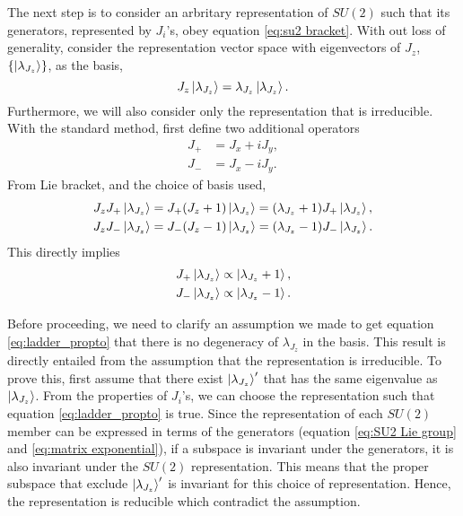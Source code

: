 \documentclass[preprint, 12pt]{revtex4-2}
\numberwithin{equation}{section}
\begin{document}
The next step is to consider an arbritary representation of $SU(2)$ such that its generators, represented by $J_i$'s, obey equation \ref{eq:su2 bracket}. With out loss of generality, consider the representation vector space with eigenvectors of $J_z$, $\{\ket{\lambda_{J_z}}\}$, as the basis,
\begin{equation}\label{eq:Jz eigenvalue equation}
    J_z\ket{\lambda_{J_z}}=\lambda_{J_z}\ket{\lambda_{J_z}}.
\end{equation}
Furthermore, we will also consider only the representation that is irreducible. With the standard method, first define two additional operators
\begin{equation}\label{eq:ladder operators}
    \begin{aligned}
        J_+ &= J_x + iJ_y, \\
        J_- &= J_x - iJ_y.
    \end{aligned}
\end{equation}
From Lie bracket, and the choice of basis used,
\begin{equation}\label{eq:ladder equation}
    \begin{aligned}
        J_zJ_+\ket{\lambda_{J_z}} &= J_+(J_z+1)\ket{\lambda_{J_z}} = (\lambda_{J_z}+1)J_+\ket{\lambda_{J_z}}, \\
        J_zJ_-\ket{\lambda_{J_z}} &= J_-(J_z-1)\ket{\lambda_{J_z}} = (\lambda_{J_z}-1)J_-\ket{\lambda_{J_z}}.
    \end{aligned}
\end{equation}
This directly implies
\begin{equation}\label{eq:ladder_propto}
    \begin{aligned}
        J_+\ket{\lambda_{J_z}} &\propto \ket{\lambda_{J_z}+1}, \\
        J_-\ket{\lambda_{J_z}} &\propto \ket{\lambda_{J_z}-1}.
    \end{aligned}
\end{equation}

Before proceeding, we need to clarify an assumption we made to get equation \ref{eq:ladder_propto} that there is no degeneracy of $\lambda_{J_z}$ in the basis. This result is directly entailed from the assumption that the representation is irreducible. To prove this, first assume that there exist $\ket{\lambda_{J_z}}'$ that has the same eigenvalue as $\ket{\lambda_{J_z}}$. From the properties of $J_i$'s, we can choose the representation such that equation \ref{eq:ladder_propto} is true. Since the representation of each $SU(2)$ member can be expressed in terms of the generators (equation \ref{eq:SU2 Lie group} and \ref{eq:matrix exponential}), if a subspace is invariant under the generators, it is also invariant under the $SU(2)$ representation. This means that the proper subspace that exclude $\ket{\lambda_{J_z}}'$ is invariant for this choice of representation. Hence, the representation is reducible which contradict the assumption.
\end{document}
